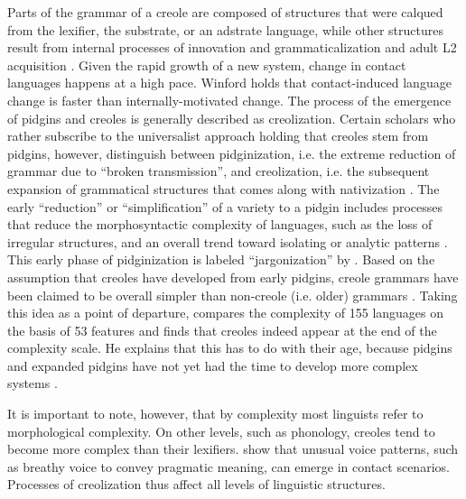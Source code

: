 \documentclass[output=paper]{langscibook}
\begin{document}
Parts of the grammar of a creole are composed of structures that were calqued from the lexifier, the substrate, or an adstrate language, while other structures result from internal processes of innovation and grammaticalization and adult L2 acquisition \parencite{bakker2008pidgins,bartens2013creole}. Given the rapid growth of a new system, change in contact languages happens at a high pace. Winford \parencite[in][]{baptista2017competition} holds that contact-induced language change is faster than internally-motivated change. The process of the emergence of pidgins and creoles is generally described as creolization. Certain scholars who rather subscribe to the universalist approach holding that creoles stem from pidgins, however, distinguish between pidginization, i.e. the extreme reduction of grammar due to ``broken transmission'', and creolization, i.e. the subsequent expansion of grammatical structures that comes along with nativization \parencite[e.g.][3, 9]{parkvall2000out}. The early “reduction” \parencite{bakker2008pidgins} or “simplification” \parencite{mcworther2011why} of a variety to a pidgin includes processes that reduce the morphosyntactic complexity of languages, such as the loss of irregular structures, and an overall trend toward isolating or analytic patterns \parencite{trudgill2011sociolinguistic}. This early phase of pidginization is labeled ``jargonization'' by \parencite[50]{good2013typologizing}. Based on the assumption that creoles have developed from early pidgins, creole grammars have been claimed to be overall simpler than non-creole (i.e. older) grammars \parencite{mcworther2011why}. Taking this idea as a point of departure, \textcite{parkvall2008simplicity} compares the complexity of 155 languages on the basis of 53 features and finds that creoles indeed appear at the end of the complexity scale. He explains that this has to do with their age, because pidgins and expanded pidgins have not yet had the time to develop more complex systems \parencite[283]{parkvall2008simplicity}. 

It is important to note, however, that by complexity most linguists refer to morphological complexity. On other levels, such as phonology, creoles tend to become more complex than their lexifiers. \citet{perezetal2019relevance} show that unusual voice patterns, such as breathy voice to convey pragmatic meaning, can emerge in contact scenarios. Processes of creolization thus affect all levels of linguistic structures.
\end{document}
